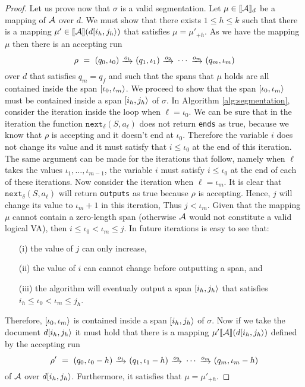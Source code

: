 \begin{proof}
    Let us prove now that $\sigma$ is a valid segmentation. Let $\mu \in \llbracket\mathcal{A}\rrbracket_d$ be a mapping of $\mathcal{A}$ over $d$. We must show that there exists $1 \leq h \leq k$ such that there is a mapping $\mu' \in \llbracket\mathcal{A}\rrbracket(d[i_h, j_h\rangle)$ that satisfies $\mu = \mu'_{+h}$. As we have the mapping $\mu$ then there is an accepting run 
    $$
    \rho \ = \ (q_0, \iota_0) \ \trans{o_1} \ (q_1, \iota_1) \ \trans{o_2} \ \cdots \ \trans{o_m} \ (q_m, \iota_m)
    $$ 
    over $d$ that satisfies $q_m = q_f$ and such that the spans that $\mu$ holds are all contained inside the span $[\iota_0, \iota_m\rangle$. We proceed to show that the span $[\iota_0, \iota_m\rangle$ must be contained inside a span $[i_h, j_h\rangle$ of $\sigma$. In Algorithm \ref{alg:segmentation}, consider the iteration inside the loop when $\ell = \iota_0$. We can be sure that in the iteration the function $\texttt{next}_\delta(S, a_\ell)$ does not return \texttt{ends} as true, because we know that $\rho$ is accepting and it doesn't end at $\iota_0$. Therefore the variable $i$ does not change its value and it must satisfy that $i \leq \iota_0$ at the end of this iteration. The same argument can be made for the iterations that follow, namely when $\ell$ takes the values $\iota_1, \ldots, \iota_{m-1}$, the variable $i$ must satisfy $i \leq \iota_0$ at the end of each of these iterations. Now consider the iteration when $\ell = \iota_m$. It is clear that $\texttt{next}_\delta(S, a_\ell)$ will return \texttt{outputs} as true because $\rho$ is accepting. Hence, $j$ will change its value to $\iota_m + 1$ in this iteration, Thus $j < \iota_m$. Given that the mapping $\mu$ cannot contain a zero-length span (otherwise $\mathcal{A}$ would not constitute a valid logical VA), then $i \leq \iota_0 < \iota_m \leq j$. In future iterations is easy to see that:
    \begin{enumerate}
        \item[(i)] the value of $j$ can only increase,
        \item[(ii)] the value of $i$ can cannot change before outputting a span, and
        \item[(iii)] the algorithm will eventualy output a span $[i_h, j_h\rangle$ that satisfies $i_h \leq \iota_0 < \iota_m \leq j_h$. 
    \end{enumerate}
    Therefore, $[\iota_0, \iota_m\rangle$ is contained inside a span $[i_h, j_h\rangle$ of $\sigma$. Now if we take the document $d[i_h, j_h\rangle$ it must hold that there is a mapping $\mu' \llbracket\mathcal{A}\rrbracket(d[i_h, j_h\rangle)$ defined by the accepting run 
    $$
    \rho' \ = \ (q_0, \iota_0-h) \ \trans{o_1} \ (q_1, \iota_1-h) \ \trans{o_2} \ \cdots \ \trans{o_m} \ (q_m, \iota_m-h)
    $$ 
    of $\mathcal{A}$ over $d[i_h, j_h\rangle$. Furthermore, it satisfies that $\mu = \mu'_{+h}$.


\end{proof}
